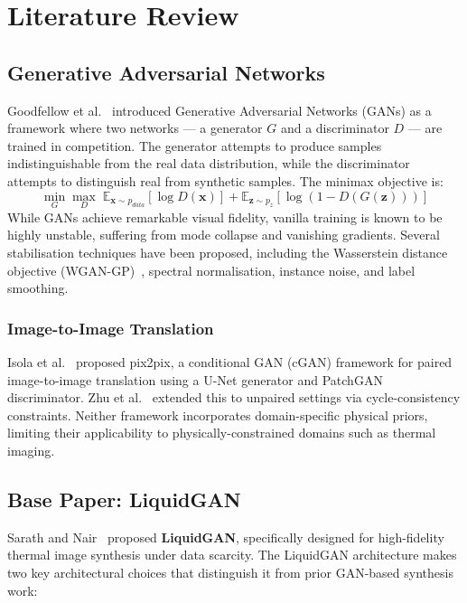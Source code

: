 \chapter{Literature Review}
\label{Chapter2}

\section{Generative Adversarial Networks}

Goodfellow et al.~\cite{b_gan} introduced Generative Adversarial Networks (GANs) as a framework where two networks --- a generator $G$ and a discriminator $D$ --- are trained in competition. The generator attempts to produce samples indistinguishable from the real data distribution, while the discriminator attempts to distinguish real from synthetic samples. The minimax objective is:
\begin{equation}
    \min_G \max_D \; \mathbb{E}_{\mathbf{x} \sim p_{data}}[\log D(\mathbf{x})] + \mathbb{E}_{\mathbf{z} \sim p_z}[\log(1 - D(G(\mathbf{z})))]
\end{equation}
While GANs achieve remarkable visual fidelity, vanilla training is known to be highly unstable, suffering from mode collapse and vanishing gradients. Several stabilisation techniques have been proposed, including the Wasserstein distance objective (WGAN-GP)~\cite{b_wgangp}, spectral normalisation, instance noise, and label smoothing.

\subsection{Image-to-Image Translation}
Isola et al.~\cite{b_pix2pix} proposed pix2pix, a conditional GAN (cGAN) framework for paired image-to-image translation using a U-Net generator and PatchGAN discriminator. Zhu et al.~\cite{b_cyclegan} extended this to unpaired settings via cycle-consistency constraints. Neither framework incorporates domain-specific physical priors, limiting their applicability to physically-constrained domains such as thermal imaging.

\section{Base Paper: LiquidGAN}

Sarath and Nair~\cite{b_liquidgan} proposed \textbf{LiquidGAN}, specifically designed for high-fidelity thermal image synthesis under data scarcity. The LiquidGAN architecture makes two key architectural choices that distinguish it from prior GAN-based synthesis work:

